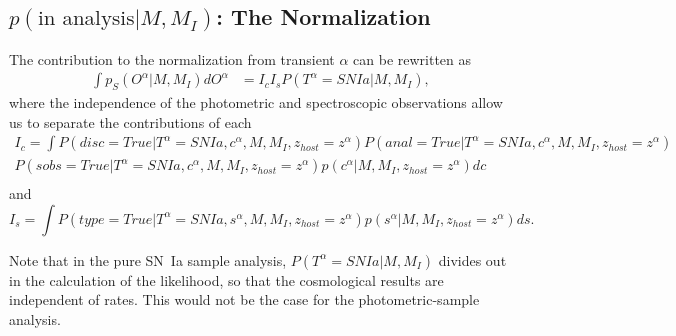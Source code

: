 \documentclass[preprint,3p]{elsarticle}
\begin{document}
\subsection{$p(\text{in analysis}|M, M_I)$: The Normalization}
The contribution to the normalization from transient $\alpha$ can be rewritten as
\begin{align}
\int p_S(O^\alpha|M, M_I)dO^\alpha &= I_c I_s P(T^\alpha=SNIa| M, M_I),
\end{align}
where the independence of the photometric and spectroscopic observations allow us to separate the contributions of each
\begin{multline}
I_c = \int  P(disc=True|T^\alpha=SNIa,c^\alpha, M, M_I,z_{host}=z^\alpha) P(anal=True|T^\alpha=SNIa,c^\alpha, M, M_I,z_{host}=z^\alpha) \\ P(sobs=True|T^\alpha=SNIa,c^\alpha, M, M_I,z_{host}=z^\alpha)
p(c^\alpha|M, M_I,z_{host}=z^\alpha) dc\\
\end{multline}
and
\begin{equation}
I_s = \int P(type=True|T^\alpha=SNIa, s^\alpha, M, M_I,z_{host}=z^\alpha)
 p(s^\alpha|M, M_I,z_{host}=z^\alpha)ds.
\end{equation}

Note that in the pure SN~Ia sample analysis, $P(T^\alpha=SNIa| M, M_I)$ divides out in the calculation of the likelihood,  so that the cosmological results
are independent of rates.  This would not be the case for the photometric-sample analysis.
\end{document}
